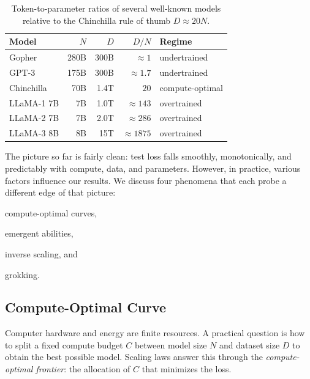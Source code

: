 \begin{table}
    \centering
    \begin{tabular}{lrrrl}
        \toprule
        Model & $N$ & $D$ & $D/N$ & Regime \\
        \midrule
        Gopher \citep{rae2021scaling}            & 280B & 300B & $\approx 1$    & undertrained \\
        GPT-3 \citep{brown2020language}          & 175B & 300B & $\approx 1.7$  & undertrained \\
        Chinchilla \citep{10.5555/3600270.3602446} & 70B  & 1.4T & $20$           & compute-optimal \\
        LLaMA-1 7B \citep{touvron2023llama1}     & 7B   & 1.0T & $\approx 143$  & overtrained \\
        LLaMA-2 7B \citep{touvron2023llama}      & 7B   & 2.0T & $\approx 286$  & overtrained \\
        LLaMA-3 8B \citep{grattafiori2024llama3herdmodels} & 8B   & 15T  & $\approx 1875$ & overtrained \\
        \bottomrule
    \end{tabular}
    \caption{Token-to-parameter ratios of several well-known models relative to the Chinchilla rule of thumb $D \approx 20N$.}
    \label{tab:token-param}
\end{table}


The picture so far is fairly clean: test loss falls smoothly, monotonically, and predictably with compute, data, and parameters. However, in practice, various factors influence our results. We discuss four phenomena that each probe a different edge of that picture:
\begin{enumerate*}[label=(\arabic*)]
    \item compute-optimal curves,
    \item emergent abilities,
    \item inverse scaling, and
    \item grokking.
\end{enumerate*}
    

\subsection{Compute-Optimal Curve}
Computer hardware and energy are finite resources. A practical question is how to split a fixed compute budget $C$ between model size $N$ and dataset size $D$ to obtain the best possible model. Scaling laws answer this through the \emph{compute-optimal frontier}: the allocation of $C$ that minimizes the loss.


